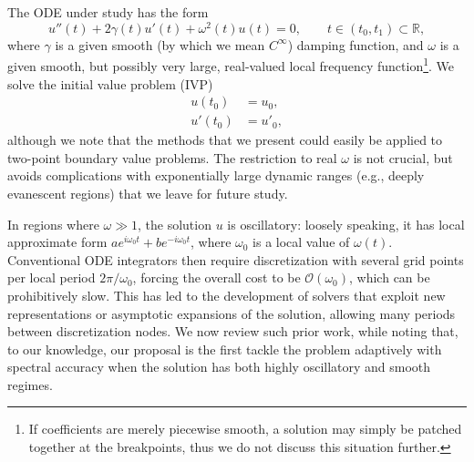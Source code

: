 \documentclass[10pt]{article}
\newcommand{\be}{\begin{equation}}
\newcommand{\ee}{\end{equation}}
\newcommand{\ba}{\begin{align}}
\newcommand{\ea}{\end{align}}
\newcommand{\R}{\mathbb{R}}
\newcommand{\bigO}{{\mathcal O}}
\newcommand{\om}{\omega}
\newcommand{\g}{\gamma}
\begin{document}
The ODE under study has the form
\be
u''(t) + 2\g(t) u'(t) + \om^2(t)u(t) = 0, \qquad t \in (t_0,t_1) \subset \R,
\label{ode}
\ee
where $\g$ is a given smooth (by which we mean $C^\infty$) damping function,
and $\om$ is a given smooth, but possibly very large, real-valued
local frequency function\footnote{If coefficients are merely piecewise smooth, a solution may simply be patched together at the breakpoints, thus we do not discuss this situation further.}.
We solve the initial value problem (IVP)
\begin{align} %
    u(t_0) &= u_0, \label{ic0} \\
    u'(t_0) &= u'_0, \label{ic1}
\end{align}
although we note that the methods that we present could easily be applied to
two-point boundary value problems.
The restriction to real $\om$ is not crucial,
but avoids complications with exponentially large dynamic ranges
(e.g., deeply evanescent regions)
that we leave for future study.
%

In regions where $\om \gg 1$,
the solution $u$ is oscillatory:
loosely speaking,
it has local approximate form $a e^{i\om_0t} + b e^{-i\om_0t}$, where $\om_0$
is a local value of $\om(t)$.
Conventional ODE integrators then require discretization with several
grid points per local period $2\pi/\om_0$, forcing the overall
cost to be $\bigO(\om_0)$, which can be prohibitively slow.
This has led to the development of solvers
that exploit new representations or asymptotic expansions of the solution, allowing many periods between discretization nodes.
We now review such prior work,
while noting that, to our knowledge, our proposal is the first
tackle the problem adaptively with spectral accuracy
when the solution has both highly oscillatory and smooth regimes.
\end{document}
